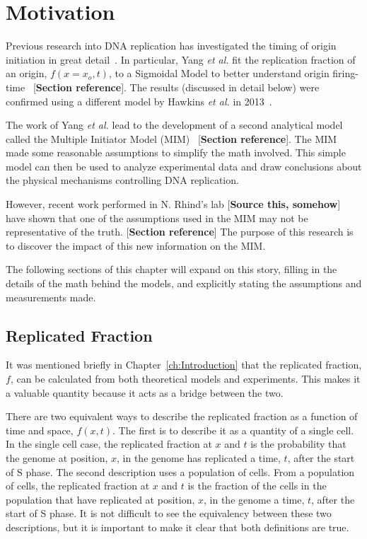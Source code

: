 \chapter{Motivation}
\label{ch:Motivation}

Previous research into DNA replication has investigated the timing of origin initiation in great detail~\cite{ScottsPaper,StochasticTermination,Bechhoefer2012374,deMouraModel1,deMouraModel2}.
In particular, Yang \emph{et al.} fit the replication fraction of an origin, $f(x=x_o,t)$, to a Sigmoidal Model to better understand origin firing-time~\cite{ScottsPaper} [\textbf{Section reference}].
The results (discussed in detail below) were confirmed using a different model by Hawkins \emph{et al.} in 2013~\cite{StochasticTermination}.

The work of Yang \emph{et al.} lead to the development of a second analytical model called the Multiple Initiator Model (MIM)~\cite{ScottsPaper} [\textbf{Section reference}].
The MIM made some reasonable assumptions to simplify the math involved.
This simple model can then be used to analyze experimental data and draw conclusions about the physical mechanisms controlling DNA replication.

However, recent work performed in N. Rhind's lab [\textbf{Source this, somehow}] have shown that one of the assumptions used in the MIM may not be representative of the truth. [\textbf{Section reference}]
The purpose of this research is to discover the impact of this new information on the MIM.

The following sections of this chapter will expand on this story, filling in the details of the math behind the models, and explicitly stating the assumptions and measurements made.


	\section{Replicated Fraction}
	\label{sec:ReplicatedFraction}
	
	It was mentioned briefly in Chapter~\ref{ch:Introduction} that the replicated fraction,$f$, can be calculated from both theoretical models and experiments.
	This makes it a valuable quantity because it acts as a bridge between the two.
	
	There are two equivalent ways to describe the replicated fraction as a function of time and space, $f(x,t)$.
	The first is to describe it as a quantity of a single cell.
	In the single cell case, the replicated fraction at $x$ and $t$ is the probability that the genome at position, $x$, in the genome has replicated a time, $t$, after the start of S phase.
	The second description uses a population of cells.
	From a population of cells, the replicated fraction at $x$ and $t$ is the fraction of the cells in the population that have replicated at position, $x$, in the genome a time, $t$, after the start of S phase.
	It is not difficult to see the equivalency between these two descriptions, but it is important to make it clear that both definitions are true.
	
